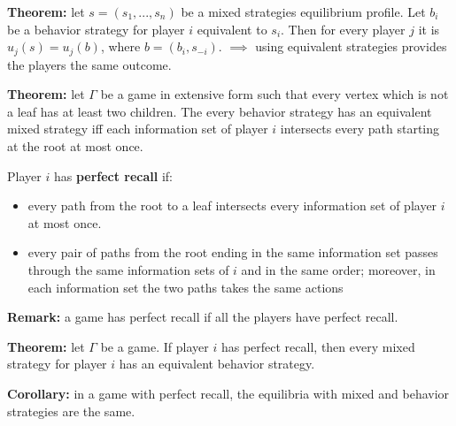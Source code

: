 \bigskip
\noindent \textbf{Theorem:} let $s = (s_1,...,s_n)$ be a mixed strategies 
equilibrium profile. Let $b_i$ be a behavior strategy for player $i$ equivalent 
to $s_i$. Then for every player $j$ it is $u_j(s) = u_j(b)$, where 
$b = (b_i,s_{-i})$.
\noindent $\implies$ using equivalent strategies provides the players the same 
outcome. 

\bigskip
\noindent \textbf{Theorem:} let $\Gamma$ be a game in extensive form such that 
every vertex which is not a leaf has at least two children. The every behavior 
strategy has an equivalent mixed strategy iff each information set of player $i$ 
intersects every path starting at the root at most once.

\bigskip
\noindent Player $i$ has \textbf{perfect recall} if:
\begin{itemize}
	\item every path from the root to a leaf intersects every information set of 
	player $i$ at most once.
	\item every pair of paths from the root ending in the same information set 
	passes through the same information sets of $i$ and in the same order; 
	moreover, in each information set the two paths takes the same actions
\end{itemize}

\noindent \textbf{Remark:} a game has perfect recall if all the players have 
perfect recall.

\bigskip
\noindent \textbf{Theorem:} let $\Gamma$ be a game. If player $i$ has perfect 
recall, then every mixed strategy for player $i$ has an equivalent behavior 
strategy.

\bigskip
\noindent \textbf{Corollary:} in a game with perfect recall, the equilibria with 
mixed and behavior strategies are the same.

%
